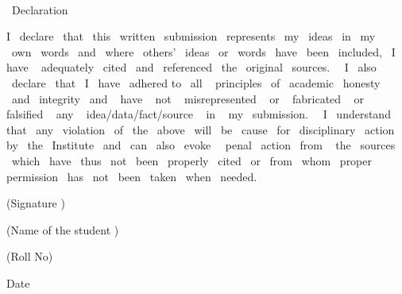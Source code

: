 
 \begin{center}
 \LARGE{Declaration }
 \end{center}

I   declare    that  this  written  submission  represents  my          ideas  in  my  own  words  and  where 
others'  ideas  or  words  have  been  included,  I  have                adequately  cited  and  referenced  the  original                     
sources.       I  also  declare  that  I  have  adhered to  all               principles  of  academic  honesty  and  integrity     
and   have   not   misrepresented   or   fabricated   or    falsified   any   idea/data/fact/source   in   my 
submission.    I   understand   that  any   violation  of  the  above    will  be  cause  for  disciplinary  action   
 by  the  Institute  and  can  also  evoke   penal  action  from        the     sources  which  have  thus  not  been 
properly  cited  or  from  whom  proper  permission  has     not    been    taken  when    needed.

\vspace{1in}

\begin{flushright}
(Signature )
\end{flushright}

\vspace{0.3in}  

\begin{flushright}
(Name of the student )
\end{flushright}

\vspace{0.3in}  

\begin{flushright}
(Roll No)
\end{flushright}

\vspace{0.3in}  

\begin{flushleft}
Date
\end{flushleft}
